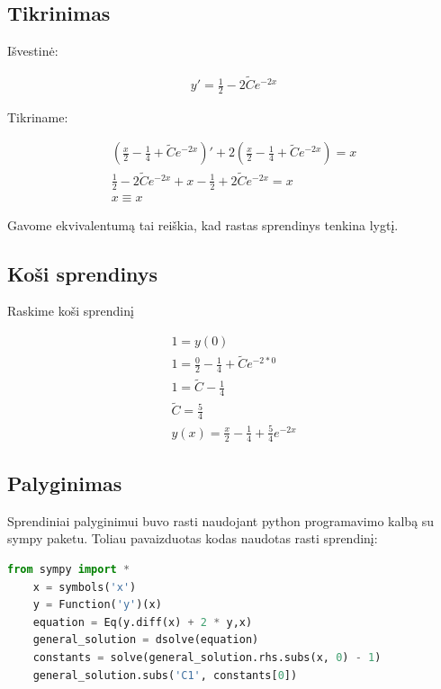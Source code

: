 \documentclass[11pt]{article}
\begin{document}
\subsection{Tikrinimas}

Išvestinė:

\begin{equation}
\begin{split}
y'=\frac{1}{2}-2\widetilde{C}e^{-2x}
\end{split}
\end{equation}

Tikriname:

\begin{equation}
\begin{split}
\left(\frac{x}{2}-\frac{1}{4}+\widetilde{C}e^{-2x}\right)'+2\left(\frac{x}{2}-\frac{1}{4}+\widetilde{C}e^{-2x}\right)=x\\
\frac{1}{2}-2\widetilde{C}e^{-2x}+x-\frac{1}{2}+2\widetilde{C}e^{-2x}=x\\
x\equiv x
\end{split}
\end{equation}

Gavome ekvivalentumą tai reiškia, kad rastas sprendinys tenkina lygtį.

\subsection*{Koši sprendinys}

Raskime koši sprendinį

\begin{equation}
\begin{split}
1=y(0)\\
1=\frac{0}{2}-\frac{1}{4}+\widetilde{C}e^{-2*0}\\
1=\widetilde{C}-\frac{1}{4}\\
\widetilde{C}=\frac{5}{4}\\
y(x)=\frac{x}{2}-\frac{1}{4}+\frac{5}{4}e^{-2x}
\end{split}
\end{equation}

\newpage
\subsection{Palyginimas}

Sprendiniai palyginimui buvo rasti naudojant 
python programavimo kalbą su sympy paketu. 
Toliau pavaizduotas kodas naudotas rasti sprendinį:

\begin{lstlisting}[language=Python]
    from sympy import *
    x = symbols('x')
    y = Function('y')(x)
    equation = Eq(y.diff(x) + 2 * y,x)
    general_solution = dsolve(equation)
    constants = solve(general_solution.rhs.subs(x, 0) - 1)
    general_solution.subs('C1', constants[0])
\end{lstlisting}
\end{document}
